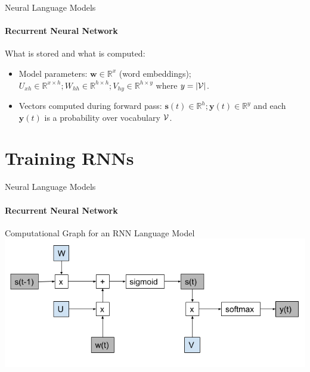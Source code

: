 \begin{frame}{Neural Language Models}
\framesubtitle{Recurrent Neural Network}
\begin{figure}[t]
\centering
{}
\end{figure}
\begin{block}{What is stored and what is computed:}
\begin{itemize}[<+->]
	\item Model parameters: $\mathbf{w} \in \mathbb{R}^x$ (word embeddings); $U_{xh} \in \mathbb{R}^{x \times h}; W_{hh} \in \mathbb{R}^{h \times h}; V_{hy} \in \mathbb{R}^{h \times y}$ where $y = |{\cal V}|$. 
	\item Vectors computed during forward pass: $\mathbf{s}(t) \in \mathbb{R}^h; \mathbf{y}(t) \in \mathbb{R}^y$ and each $\mathbf{y}(t)$ is a probability over vocabulary ${\cal V}$.
\end{itemize}
\end{block}
\end{frame}


\section{Training RNNs}

\begin{frame}{Neural Language Models}
\framesubtitle{Recurrent Neural Network}
\begin{block}{Computational Graph for an RNN Language Model}
\includegraphics[width=\textwidth]{figures/nlm/mikolovrnn-graph.png}
\end{block}
\end{frame}

